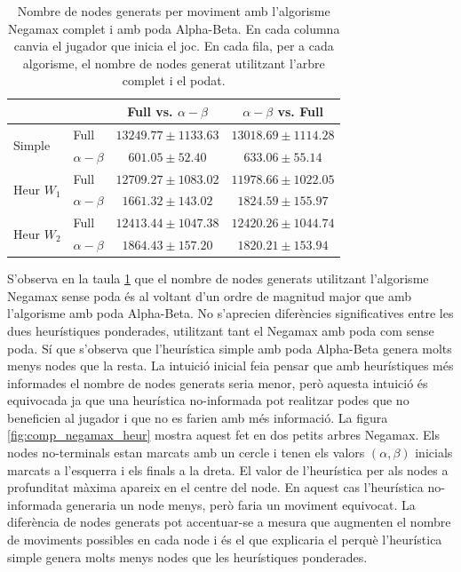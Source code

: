 \documentclass[12pt,a4paper]{article}
\begin{document}
\begin{table}[h]
\centering
\tabcolsep=0.09cm
\begin{tabular}{|l|l|c|c|}
\hline
\multicolumn{2}{|c|}{} & Full vs. $\alpha-\beta$ & $\alpha-\beta$ vs. Full \\
\hline
\multirow{2}{*}{Simple} & Full & $13249.77 \pm 1133.63$  & $13018.69 \pm 1114.28$ \\
& $\alpha-\beta$ & $601.05 \pm 52.40$ & $633.06 \pm 55.14$ \\
\hline
\multirow{2}{*}{Heur $W_1$} & Full & $12709.27 \pm 1083.02$ & $11978.66 \pm 1022.05$\\
& $\alpha-\beta$ & $1661.32 \pm 143.02$ & $1824.59 \pm 155.97$ \\
\hline
\multirow{2}{*}{Heur $W_2$} & Full & $12413.44 \pm 1047.38$  & $12420.26 \pm 1044.74$ \\
& $\alpha-\beta$ & $1864.43 \pm 157.20$ & $1820.21 \pm 153.94$\\
\hline
\end{tabular}
\caption{Nombre de nodes generats per moviment amb l'algorisme Negamax complet i amb poda Alpha-Beta. En cada columna canvia el jugador que inicia el joc. En cada fila, per a cada algorisme, el nombre de nodes generat utilitzant l'arbre complet i el podat.}
\label{tab:expr_nmax_ab}
\end{table}

S'observa en la taula \ref{tab:expr_nmax_ab} que el nombre de nodes generats utilitzant l'algorisme Negamax sense poda és al voltant d'un ordre de magnitud major que amb l'algorisme amb poda Alpha-Beta. No s'aprecien diferències significatives entre les dues heurístiques ponderades, utilitzant tant el Negamax amb poda com sense poda. Sí que s'observa que l'heurística simple amb poda Alpha-Beta genera molts menys nodes que la resta. La intuició inicial feia pensar que amb heurístiques més informades el nombre de nodes generats seria menor, però aquesta intuició és equivocada ja que una heurística no-informada pot realitzar podes que no beneficien al jugador i que no es farien amb més informació. La figura \ref{fig:comp_negamax_heur} mostra aquest fet en dos petits arbres Negamax. Els nodes no-terminals estan marcats amb un cercle i tenen els valors $(\alpha,\beta)$ inicials marcats a l'esquerra i els finals a la dreta. El valor de l'heurística per als nodes a profunditat màxima apareix en el centre del node. En aquest cas l'heurística no-informada generaria un node menys, però faria un moviment equivocat. La diferència de nodes generats pot accentuar-se a mesura que augmenten el nombre de moviments possibles en cada node i és el que explicaria el perquè l'heurística simple genera molts menys nodes que les heurístiques ponderades.\\
\end{document}
